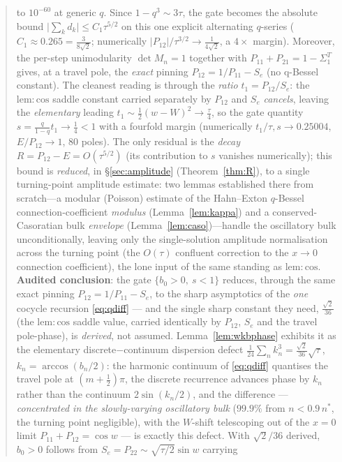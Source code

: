 \documentclass[11pt]{article}
\begin{document}
\begin{abstract}
\begin{enumerate}[leftmargin=1.6em,itemsep=0.15em]
to $10^{-60}$ at generic $q$. Since $1-q^3\sim3\tau$, the gate becomes the absolute bound
$\bigl|\sum_k d_k\bigr|\le C_1\tau^{5/2}$ on this one explicit alternating $q$-series
($C_1\approx0.265=\tfrac{3}{8\sqrt2}$; numerically $|P_{12}|/\tau^{3/2}\to\tfrac1{4\sqrt2}$, a $4\times$ margin).
Moreover, the per-step unimodularity $\det M_n=1$ together with $P_{11}+P_{21}=1-\Sigma_1^T$ gives, at a travel
pole, the \emph{exact} pinning $P_{12}=1/P_{11}-S_e$ (no q-Bessel constant). The cleanest reading is through the
\emph{ratio} $t_1=P_{12}/S_e$: the $\mathrm{lem:cos}$ saddle constant carried separately by $P_{12}$ and $S_e$
\emph{cancels}, leaving the \emph{elementary} leading $t_1\sim\tfrac12(w-W)^2\to\tfrac\tau4$, so the gate quantity
$s=\tfrac{q}{1-q}t_1\to\tfrac14<1$ with a fourfold margin (numerically $t_1/\tau,s\to0.25004$, $E/P_{12}\to1$,
$80$ poles). The only residual is the \emph{decay} $R=P_{12}-E=O(\tau^{5/2})$ (its contribution to $s$ vanishes numerically); this bound is \emph{reduced}, in \S\ref{sec:amplitude} (Theorem~\ref{thm:R}), to a single turning-point amplitude estimate: two lemmas established there from scratch---a modular (Poisson) estimate of the Hahn--Exton $q$-Bessel connection-coefficient \emph{modulus} (Lemma~\ref{lem:kappa}) and a conserved-Casoratian bulk \emph{envelope} (Lemma~\ref{lem:caso})---handle the oscillatory bulk unconditionally, leaving only the single-solution amplitude normalisation across the turning point (the $O(\tau)$ confluent correction to the $x\to0$ connection coefficient), the lone input of the same standing as $\mathrm{lem:cos}$.
\textbf{Audited conclusion}: the gate $\{b_0>0,\ s<1\}$ reduces, through the same exact pinning
$P_{12}=1/P_{11}-S_e$, to the sharp asymptotics of the \emph{one} cocycle recursion \eqref{eq:qdiff} --- and the
single sharp constant they need, $\tfrac{\sqrt2}{36}$ (the $\mathrm{lem:cos}$ saddle value, carried identically
by $P_{12}$, $S_e$ and the travel pole-phase), is \emph{derived}, not assumed. Lemma~\ref{lem:wkbphase} exhibits
it as the elementary discrete$-$continuum dispersion defect $\tfrac1{24}\sum_n k_n^3=\tfrac{\sqrt2}{36}\sqrt\tau$,
$k_n=\arccos(b_n/2)$: the harmonic continuum of \eqref{eq:qdiff} quantises the travel pole at $(m+\tfrac12)\pi$,
the discrete recurrence advances phase by $k_n$ rather than the continuum $2\sin(k_n/2)$, and the difference ---
\emph{concentrated in the slowly-varying oscillatory bulk} ($99.9\%$ from $n<0.9\,n^\ast$, the turning point
negligible), with the $W$-shift telescoping out of the $x{=}0$ limit $P_{11}+P_{12}=\cos w$ --- is exactly this
defect. With $\sqrt2/36$ derived, $b_0>0$ follows from $S_e=P_{22}\sim\sqrt{\tau/2}\sin w$ carrying

\end{enumerate}
\end{abstract}
\end{document}
